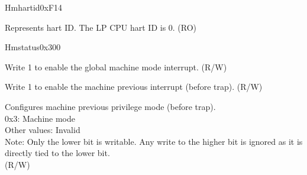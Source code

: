 \begin{register}{H}{mhartid}{0xF14}\label{regdesc:LPMHARTID}
%
\regnewline%
\begin{regdesc}\begin{reglist}
\label{fielddesc:LPMHARTID}\item [MHARTID] Represents hart ID. The LP CPU hart ID is 0. (RO)
\end{reglist}\end{regdesc}
\end{register}

\begin{register}{H}{mstatus}{0x300}\label{regdesc:LPMSTATUS}
%
%
%
%
%
%
%
%
%
\regnewline%
\begin{regdesc}\begin{reglist}
\label{fielddesc:LPMSTATUSMIE}\item [MIE] Write 1 to enable the global machine mode interrupt. (R/W)
\label{fielddesc:LPMSTATUSMPIE}\item [MPIE] Write 1 to enable the machine previous interrupt (before trap). (R/W)
\label{fielddesc:LPMSTATUSMPP}\item [MPP] Configures machine previous privilege mode (before trap).\\
0x3: Machine mode\\
Other values: Invalid\\
Note: Only the lower bit is writable. Any write to the higher bit is ignored as it is directly tied to the lower bit.\\
(R/W)
\end{reglist}\end{regdesc}
\end{register}


